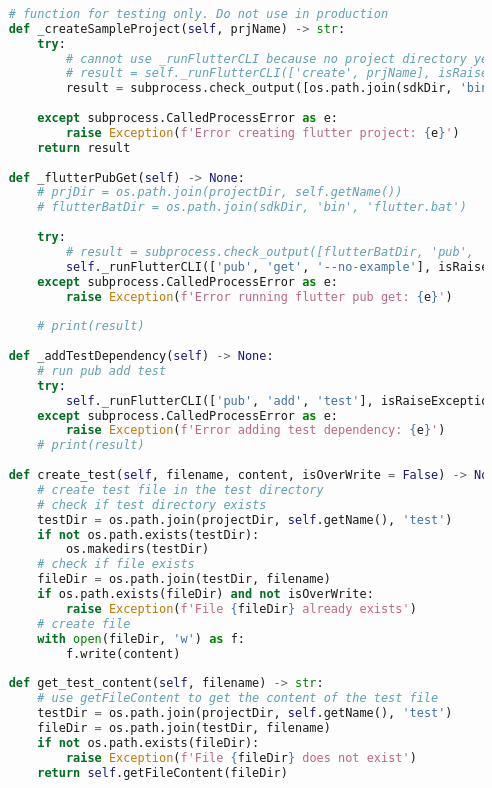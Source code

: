 \begin{lstlisting}[language=Python, caption={$\texttt{Flutter}$ class - subclass of Project.}, label={lst:2}]
    
    # function for testing only. Do not use in production
    def _createSampleProject(self, prjName) -> str:
        try:
            # cannot use _runFlutterCLI because no project directory yet
            # result = self._runFlutterCLI(['create', prjName], isRaiseException=True)
            result = subprocess.check_output([os.path.join(sdkDir, 'bin', 'flutter'), 'create', prjName],cwd=projectDir, universal_newlines=True, encoding='utf-8',  shell=True)
            
        except subprocess.CalledProcessError as e:
            raise Exception(f'Error creating flutter project: {e}')
        return result
    
    def _flutterPubGet(self) -> None:
        # prjDir = os.path.join(projectDir, self.getName())
        # flutterBatDir = os.path.join(sdkDir, 'bin', 'flutter.bat')
        
        try:
            # result = subprocess.check_output([flutterBatDir, 'pub', 'get'], cwd=prjDir, universal_newlines=True)
            self._runFlutterCLI(['pub', 'get', '--no-example'], isRaiseException=True)
        except subprocess.CalledProcessError as e:
            raise Exception(f'Error running flutter pub get: {e}')
        
        # print(result)
        
    def _addTestDependency(self) -> None:
        # run pub add test
        try:
            self._runFlutterCLI(['pub', 'add', 'test'], isRaiseException=True)
        except subprocess.CalledProcessError as e:
            raise Exception(f'Error adding test dependency: {e}')
        # print(result)
    
    def create_test(self, filename, content, isOverWrite = False) -> None:
        # create test file in the test directory
        # check if test directory exists
        testDir = os.path.join(projectDir, self.getName(), 'test')
        if not os.path.exists(testDir):
            os.makedirs(testDir)
        # check if file exists
        fileDir = os.path.join(testDir, filename)
        if os.path.exists(fileDir) and not isOverWrite:
            raise Exception(f'File {fileDir} already exists')
        # create file
        with open(fileDir, 'w') as f:
            f.write(content)
            
    def get_test_content(self, filename) -> str:
        # use getFileContent to get the content of the test file
        testDir = os.path.join(projectDir, self.getName(), 'test')
        fileDir = os.path.join(testDir, filename)
        if not os.path.exists(fileDir):
            raise Exception(f'File {fileDir} does not exist')
        return self.getFileContent(fileDir)
    

\end{lstlisting}
